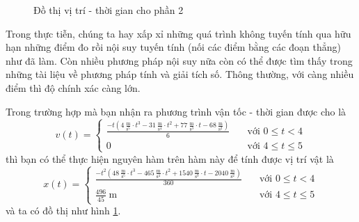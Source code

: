 \documentclass[a4paper, titlepage, openany]{book}
\begin{document}
\begin{figure}[h!]
   \centering
   \caption{Đồ thị vị trí - thời gian cho phần 2}
   \label{fig:vttgp2}
\end{figure}

Trong thực tiễn, chúng ta hay xấp xỉ những quá trình không tuyến tính qua hữu hạn những điểm đo rồi nội suy tuyến tính (nối các điểm bằng các đoạn thẳng) như đã làm. Còn nhiều phương pháp nội suy nữa còn có thể được tìm thấy trong những tài liệu về phương pháp tính và giải tích số. Thông thường, với càng nhiều điểm thì độ chính xác càng lớn.

Trong trường hợp mà bạn nhận ra phương trình vận tốc - thời gian được cho là
\begin{equation*}
   v(t) =
   \begin{cases}
      \displaystyle \frac{\displaystyle -t\left(4\ \frac{\text{m}}{\text{s}^5}\cdot t^3-31\ \frac{\text{m}}{\text{s}^4}\cdot t^2+77\ \frac{\text{m}}{\text{s}^3}\cdot t-68\ \frac{\text{m}}{\text{s}^2}\right)}{6} &\quad \text{với } 0 \leq t < 4 \\
      0&\quad \text{với } 4 \leq t \leq 5
   \end{cases}
\end{equation*}
thì bạn có thể thực hiện nguyên hàm trên hàm này để tính được vị trí vật là
\begin{equation*}
   \displaystyle 
   x(t) =
   \begin{cases}
      \displaystyle \frac{\displaystyle -t^2\left(48\ \frac{\text{m}}{\text{s}^5}\cdot t^3-465\ \frac{\text{m}}{\text{s}^4}\cdot t^2+1540\ \frac{\text{m}}{\text{s}^3}\cdot t-2040\ \frac{\text{m}}{\text{s}^2}\right)}{360} &\quad \text{với } 0 \leq t < 4 \\
      \displaystyle \frac{496}{45}\ \text{m}&\quad \text{với } 4 \leq t \leq 5
   \end{cases}
\end{equation*}
và ta có đồ thị như hình \ref{fig:vttgp2}.
\end{document}
